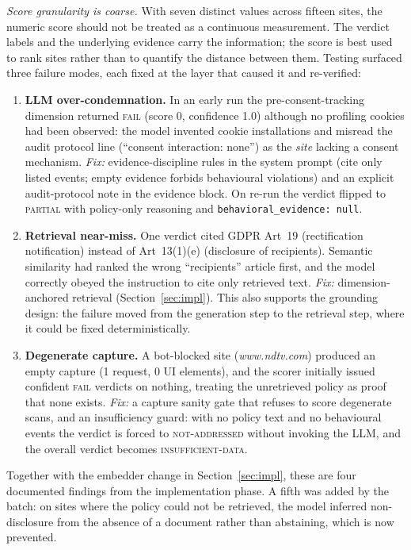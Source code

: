 \documentclass[conference]{IEEEtran}
\begin{document}
\emph{Score granularity is coarse.} With seven distinct values across fifteen sites, the numeric score should not be treated as a continuous measurement. The verdict labels and the underlying evidence carry the information; the score is best used to rank sites rather than to quantify the distance between them.
Testing surfaced three failure modes, each fixed at the layer that caused it and re-verified:
\begin{enumerate}
    \item \textbf{LLM over-condemnation.} In an early run the pre-consent-tracking dimension returned \textsc{fail} (score 0, confidence 1.0) although no profiling cookies had been observed: the model invented cookie installations and misread the audit protocol line (``consent interaction: none'') as the \emph{site} lacking a consent mechanism. \emph{Fix:} evidence-discipline rules in the system prompt (cite only listed events; empty evidence forbids behavioural violations) and an explicit audit-protocol note in the evidence block. On re-run the verdict flipped to \textsc{partial} with policy-only reasoning and \texttt{behavioral\_evidence: null}.
    \item \textbf{Retrieval near-miss.} One verdict cited GDPR Art~19 (rectification notification) instead of Art~13(1)(e) (disclosure of recipients). Semantic similarity had ranked the wrong ``recipients'' article first, and the model correctly obeyed the instruction to cite only retrieved text. \emph{Fix:} dimension-anchored retrieval (Section~\ref{sec:impl}). This also supports the grounding design: the failure moved from the generation step to the retrieval step, where it could be fixed deterministically.
    \item \textbf{Degenerate capture.} A bot-blocked site (\textsl{www.ndtv.com}) produced an empty capture (1 request, 0 UI elements), and the scorer initially issued confident \textsc{fail} verdicts on nothing, treating the unretrieved policy as proof that none exists. \emph{Fix:} a capture sanity gate that refuses to score degenerate scans, and an insufficiency guard: with no policy text and no behavioural events the verdict is forced to \textsc{not-addressed} without invoking the LLM, and the overall verdict becomes \textsc{insufficient-data}.
\end{enumerate}
Together with the embedder change in Section~\ref{sec:impl}, these are four documented findings from the implementation phase. A fifth was added by the batch: on sites where the policy could not be retrieved, the model inferred non-disclosure from the absence of a document rather than abstaining, which is now prevented.
\end{document}
